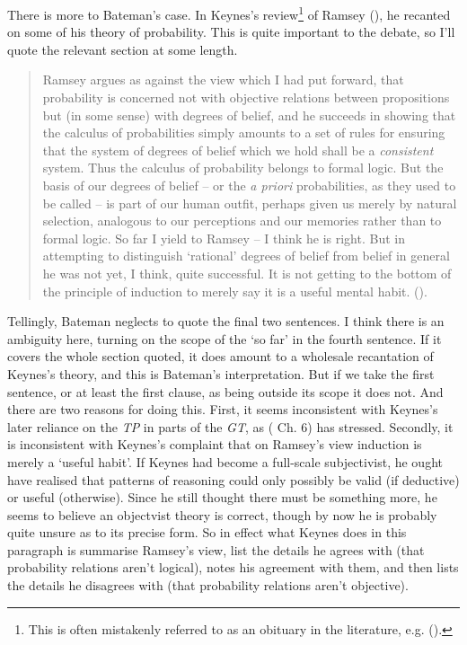 \documentclass[
  11pt,
  letterpaper,
  DIV=11,
  numbers=noendperiod,
  twoside]{scrartcl}
\begin{document}
There is more to Bateman's case. In Keynes's review\footnote{This is
  often mistakenly referred to as an obituary in the literature, e.g.
  ().} of Ramsey
(), he recanted on some of his theory of
probability. This is quite important to the debate, so I'll quote the
relevant section at some length.

\begin{quote}
Ramsey argues as against the view which I had put forward, that
probability is concerned not with objective relations between
propositions but (in some sense) with degrees of belief, and he succeeds
in showing that the calculus of probabilities simply amounts to a set of
rules for ensuring that the system of degrees of belief which we hold
shall be a \emph{consistent} system. Thus the calculus of probability
belongs to formal logic. But the basis of our degrees of belief -- or
the \emph{a priori} probabilities, as they used to be called -- is part
of our human outfit, perhaps given us merely by natural selection,
analogous to our perceptions and our memories rather than to formal
logic. So far I yield to Ramsey -- I think he is right. But in
attempting to distinguish `rational' degrees of belief from belief in
general he was not yet, I think, quite successful. It is not getting to
the bottom of the principle of induction to merely say it is a useful
mental habit. ().
\end{quote}

Tellingly, Bateman neglects to quote the final two sentences. I think
there is an ambiguity here, turning on the scope of the `so far' in the
fourth sentence. If it covers the whole section quoted, it does amount
to a wholesale recantation of Keynes's theory, and this is Bateman's
interpretation. But if we take the first sentence, or at least the first
clause, as being outside its scope it does not. And there are two
reasons for doing this. First, it seems inconsistent with Keynes's later
reliance on the \emph{TP} in parts of the \emph{GT}, as
( Ch. 6) has stressed.
Secondly, it is inconsistent with Keynes's complaint that on Ramsey's
view induction is merely a `useful habit'. If Keynes had become a
full-scale subjectivist, he ought have realised that patterns of
reasoning could only possibly be valid (if deductive) or useful
(otherwise). Since he still thought there must be something more, he
seems to believe an objectvist theory is correct, though by now he is
probably quite unsure as to its precise form. So in effect what Keynes
does in this paragraph is summarise Ramsey's view, list the details he
agrees with (that probability relations aren't logical), notes his
agreement with them, and then lists the details he disagrees with (that
probability relations aren't objective).
\end{document}
